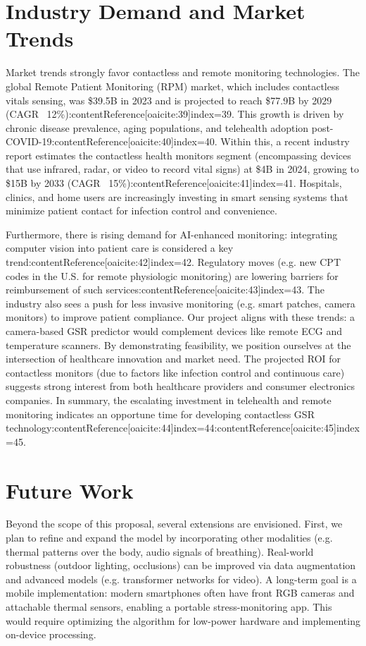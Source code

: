     \section{Industry Demand and Market Trends}
    Market trends strongly favor contactless and remote monitoring technologies. The global Remote Patient Monitoring (RPM) market, which includes contactless vitals sensing, was \$39.5B in 2023 and is projected to reach \$77.9B by 2029 (CAGR ~12\%):contentReference[oaicite:39]{index=39}. This growth is driven by chronic disease prevalence, aging populations, and telehealth adoption post-COVID-19:contentReference[oaicite:40]{index=40}. Within this, a recent industry report estimates the contactless health monitors segment (encompassing devices that use infrared, radar, or video to record vital signs) at \$4B in 2024, growing to \$15B by 2033 (CAGR ~15\%):contentReference[oaicite:41]{index=41}. Hospitals, clinics, and home users are increasingly investing in smart sensing systems that minimize patient contact for infection control and convenience.

    Furthermore, there is rising demand for AI-enhanced monitoring: integrating computer vision into patient care is considered a key trend:contentReference[oaicite:42]{index=42}. Regulatory moves (e.g. new CPT codes in the U.S. for remote physiologic monitoring) are lowering barriers for reimbursement of such services:contentReference[oaicite:43]{index=43}. The industry also sees a push for less invasive monitoring (e.g. smart patches, camera monitors) to improve patient compliance. Our project aligns with these trends: a camera-based GSR predictor would complement devices like remote ECG and temperature scanners. By demonstrating feasibility, we position ourselves at the intersection of healthcare innovation and market need. The projected ROI for contactless monitors (due to factors like infection control and continuous care) suggests strong interest from both healthcare providers and consumer electronics companies. In summary, the escalating investment in telehealth and remote monitoring indicates an opportune time for developing contactless GSR technology:contentReference[oaicite:44]{index=44}:contentReference[oaicite:45]{index=45}.


    \section{Future Work}
    Beyond the scope of this proposal, several extensions are envisioned. First, we plan to refine and expand the model by incorporating other modalities (e.g. thermal patterns over the body, audio signals of breathing). Real-world robustness (outdoor lighting, occlusions) can be improved via data augmentation and advanced models (e.g. transformer networks for video). A long-term goal is a mobile implementation: modern smartphones often have front RGB cameras and attachable thermal sensors, enabling a portable stress-monitoring app. This would require optimizing the algorithm for low-power hardware and implementing on-device processing.

